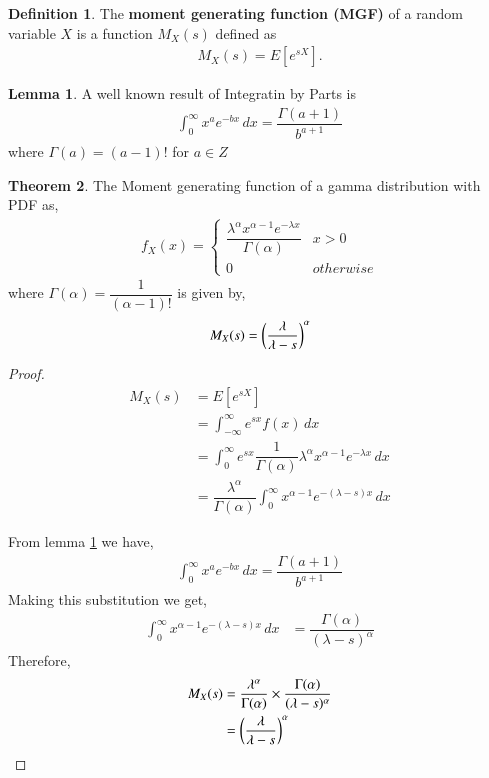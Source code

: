 \documentclass[journal,12pt,twocolumn]{IEEEtran}
\theoremstyle{definition}
\newtheorem{definition}{Definition}[section]
\newtheorem{theorem}{Theorem}[section]
\newtheorem{lemma}[theorem]{Lemma}
\begin{document}
\begin{definition}
The \textbf{moment generating function (MGF)} of a random variable $X$ is a function $ M_X(s) $ defined as
\begin{align}
    M_X(s) = E[e^{sX}].
\end{align}
\end{definition}
\begin{lemma}
\label{ibp}
A well known result of Integratin by Parts is 
\begin{align}
    \int_{0}^{\infty} x^a e^{-bx}\,dx = \dfrac{\Gamma(a+1)}{b^{a+1}}
    \label{eqidentity}
\end{align}
where $ \Gamma(a) = (a-1)!$ for $ a \in Z$
\end{lemma}
\begin{theorem}
\label{gamma}
 The Moment generating function of a gamma distribution with PDF as,
 \begin{align}
f_{X}(x)  = 
\begin{cases}
\dfrac{\lambda^{\alpha}x^{\alpha-1}e^{-\lambda x}}{\Gamma(\alpha)} &  x > 0
\\
0 & otherwise
\end{cases}
\end{align}
where $ \Gamma(\alpha) = \dfrac{1}{(\alpha-1)!}$
is given by,
\begin{align}
    M_X(s) = \left(\dfrac{\lambda}{\lambda-s}\right)^{\alpha}
\end{align}
\end{theorem}
\begin{proof}
\begin{align}
    M_X(s) &= E[e^{sX}] \\
    &=  \int_{-\infty}^{\infty} e^{sx} f(x)\,dx \\
    &=    \int_{0}^{\infty} e^{sx} \dfrac{1}{\Gamma(\alpha)} \lambda^\alpha x^{\alpha-1}e^{-\lambda x}\,dx \\
    &= \dfrac{\lambda^\alpha}{\Gamma(\alpha)} \int_{0}^{\infty} x^{\alpha-1} e^{-(\lambda - s) x}\,dx 
\end{align}

From lemma \ref{ibp} we have,
\begin{align}
    \int_{0}^{\infty} x^a e^{-bx}\,dx = \dfrac{\Gamma(a+1)}{b^{a+1}}
    \label{eqidentity}
\end{align}
Making this substitution we get,
\begin{align}
  \int_{0}^{\infty} x^{\alpha-1} e^{-(\lambda - s) x}\,dx    &= \dfrac{\Gamma(\alpha)}{(\lambda - s)^\alpha}
\end{align}
Therefore,
\begin{align}
     M_X(s) &= \dfrac{\lambda^\alpha}{\Gamma(\alpha)} \times \dfrac{\Gamma(\alpha)}{(\lambda-s)^\alpha} \\
     &= \left(\dfrac{\lambda}{\lambda-s}\right)^\alpha
\end{align}
\end{proof}
\end{document}
